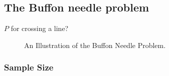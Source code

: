 \documentclass[
  a4paper,
]{scrbook}
\begin{document}
\subsection{The Buffon needle problem}\label{the-buffon-needle-problem}

\(P\) for crossing a line?

\begin{figure}[ht]


\caption{\label{fig-buffon-needle-experiment}An Illustration of the
Buffon Needle Problem.}

\end{figure}%

\subsubsection{Sample Size}\label{sample-size}
\end{document}
